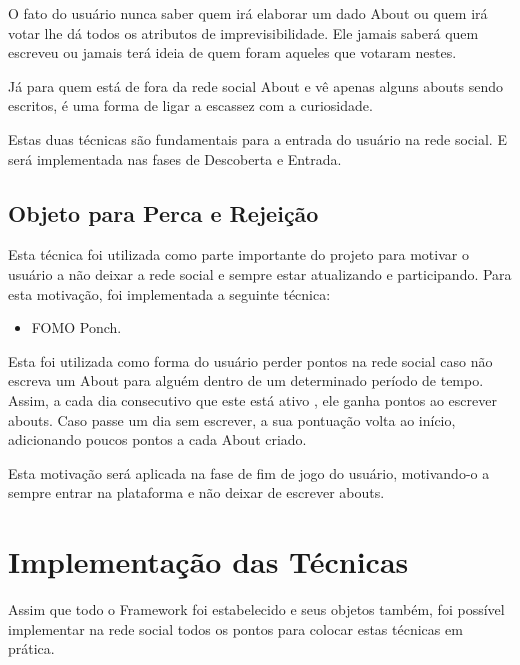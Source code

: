 O fato do usuário nunca saber quem irá elaborar um dado About ou quem irá votar lhe dá
todos os atributos de imprevisibilidade. Ele jamais saberá quem escreveu ou jamais terá
ideia de quem foram aqueles que votaram nestes. 

Já para quem está de fora da rede social About e vê apenas alguns abouts sendo escritos, é uma forma
de ligar a escassez com a curiosidade.

Estas duas técnicas são fundamentais para a entrada do usuário na rede social. E será implementada
nas fases de Descoberta e Entrada.

\subsection{Objeto para Perca e Rejeição}
\label{sub:objeto_perca_rejeicao}
Esta técnica foi utilizada como parte importante do projeto para motivar o usuário a não deixar a rede
social e sempre estar atualizando e participando. Para esta motivação, foi implementada a seguinte técnica:

\begin{itemize}
    \item FOMO Ponch.
\end{itemize}

Esta foi utilizada como forma do usuário perder pontos na rede social caso não escreva um About para alguém
dentro de um determinado período de tempo. Assim, a cada dia consecutivo que este está ativo
, ele ganha pontos ao escrever abouts. Caso passe um dia sem escrever, a sua pontuação volta ao início, adicionando
poucos pontos a cada About criado.

Esta motivação será aplicada na fase de fim de jogo do usuário, motivando-o a sempre entrar na plataforma
e não deixar de escrever abouts.

\section{Implementação das Técnicas}
\label{sec:gamifição}
Assim que todo o Framework foi estabelecido e seus objetos também, foi possível implementar
na rede social todos os pontos para colocar estas técnicas em prática.

